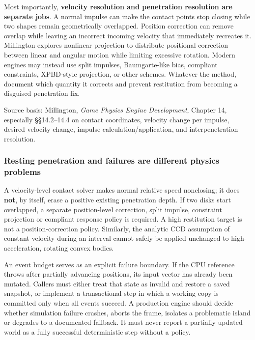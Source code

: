 Most importantly, \textbf{velocity resolution and penetration resolution are separate jobs}. A normal impulse can make the contact points stop closing while two shapes remain geometrically overlapped. Position correction can remove overlap while leaving an incorrect incoming velocity that immediately recreates it. Millington explores nonlinear projection to distribute positional correction between linear and angular motion while limiting excessive rotation. Modern engines may instead use split impulses, Baumgarte-like bias, compliant constraints, XPBD-style projection, or other schemes. Whatever the method, document which quantity it corrects and prevent restitution from becoming a disguised penetration fix.

Source basis: Millington, \emph{Game Physics Engine Development}, Chapter 14, especially §§14.2--14.4 on contact coordinates, velocity change per impulse, desired velocity change, impulse calculation/application, and interpenetration resolution.

\subsubsection{Resting penetration and failures are different physics problems}\label{06-engine-ii-ch046-resting-penetration-and-failures-are-different-physics-problems}

\hypertarget{06-engine-ii-ch046-resting-penetration-and-failures-are-different-physics-problems}{}

A velocity-level contact solver makes normal relative speed nonclosing; it does \textbf{not}, by itself, erase a positive existing penetration depth. If two disks start overlapped, a separate position-level correction, split impulse, constraint projection or compliant response policy is required. A high restitution target is not a position-correction policy. Similarly, the analytic CCD assumption of constant velocity during an interval cannot safely be applied unchanged to high-acceleration, rotating convex bodies.

An event budget serves as an explicit failure boundary. If the CPU reference throws after partially advancing positions, its input vector has already been mutated. Callers must either treat that state as invalid and restore a saved snapshot, or implement a transactional step in which a working copy is committed only when all events succeed. A production engine should decide whether simulation failure crashes, aborts the frame, isolates a problematic island or degrades to a documented fallback. It must never report a partially updated world as a fully successful deterministic step without a policy.

